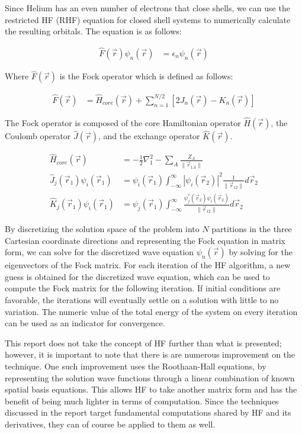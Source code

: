 \documentclass[conference, twoside]{IEEEtran}
\begin{document}
Since Helium has an even number of electrons that close shells, we can use the restricted HF (RHF) equation for closed shell systems to numerically calculate the resulting orbitals. The equation is as follows:

\begin{align}
  \hat{F}(\vec{r})\psi_n(\vec{r}) &= \epsilon_n\psi_n(\vec{r})
\end{align}

Where $\hat{F}(\vec{r})$ is the Fock operator which is defined as follows:

\begin{align}
  \hat{F}(\vec{r}) &= \hat{H}_{core}(\vec{r}) + \sum_{n=1}^{N/2}\left[2J_n(\vec{r}) - K_n(\vec{r})\right]
\end{align}

The Fock operator is composed of the core Hamiltonian operator $\hat{H}(\vec{r})$, the Coulomb operator $\hat{J}(\vec{r})$, and the exchange operator $\hat{K}(\vec{r})$.

\begin{align}
  \hat{H}_{core}(\vec{r}) &= -\frac{1}{2}\nabla_1^2 - \sum_A\frac{Z_A}{\|\vec{r}_{1 A}\|}\\
  \hat{J}_j(\vec{r}_1)\psi_i(\vec{r}_1) &= \psi_i(\vec{r}_1)\int_{-\infty}^{\infty}\left|\psi_i(\vec{r}_2)\right|^2\frac{1}{\|\vec{r}_{12}\|}d\vec{r}_2 \\
  \hat{K}_j(\vec{r}_1)\psi_i(\vec{r}_1) &= \psi_j(\vec{r}_1)\int_{-\infty}^{\infty}\frac{\psi_j^\ast(\vec{r}_2)\psi_i(\vec{r}_2)}{\|\vec{r}_{12}\|}d\vec{r}_2
\end{align}

By discretizing the solution space of the problem into $N$ partitions in the three Cartesian coordinate directions and representing the Fock equation in matrix form, we can solve for the discretized wave equation $\psi_n(\vec{r})$ by solving for the eigenvectors of the Fock matrix. For each iteration of the HF algorithm, a new guess is obtained for the discretized wave equation, which can be used to compute the Fock matrix for the following iteration. If initial conditions are favorable, the iterations will eventually settle on a solution with little to no variation. The numeric value of the total energy of the system on every iteration can be used as an indicator for convergence.

This report does not take the concept of HF further than what is presented; however, it is important to note that there is are numerous improvement on the technique. One such improvement uses the Roothaan-Hall equations, by representing the solution wave functions through a linear combination of known spatial basis equations. This allows HF to take another matrix form and has the benefit of being much lighter in terms of computation. Since the techniques discussed in the report target fundamental computations shared by HF and its derivatives, they can of course be applied to them as well.
\end{document}
